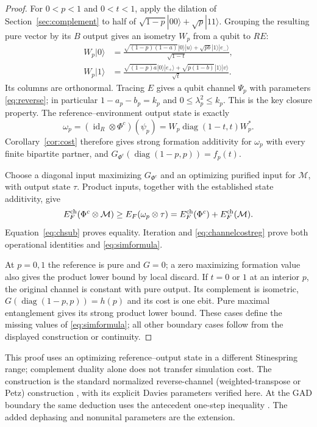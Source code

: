 \documentclass[11pt]{article}
\begin{document}
\begin{proof}
For $0<p<1$ and $0<t<1$, apply the dilation of Section~\ref{sec:complement}
to half of $\sqrt{1-p}|00\rangle+\sqrt p|11\rangle$. Grouping the resulting
pure vector by its $B$ output gives an isometry $W_p$ from a qubit to $R E$:
\begin{align*}
 W_p|0\rangle&=\frac{\sqrt{(1-p)(1-a)}|0\rangle|u\rangle+
                           \sqrt{pb}|1\rangle|e_-\rangle}{\sqrt{1-t}},\\
 W_p|1\rangle&=\frac{\sqrt{(1-p)a}|0\rangle|e_+\rangle+
                           \sqrt{p(1-b)}|1\rangle|v\rangle}{\sqrt t}.
\end{align*}
Its columns are orthonormal. Tracing $E$ gives a qubit channel $\Psi_p$ with
parameters \eqref{eq:reverse}; in particular $1-a_p-b_p=k_p$ and
$0\le\lambda_p^2\le k_p$. This is the key closure property. The
reference--environment output state is exactly
\[
 \omega_p=(\operatorname{id}_R\otimes\Phi^c)(\psi_p)
            =W_p\operatorname{diag}(1-t,t)W_p^*.
\]
Corollary~\ref{cor:cost} therefore gives strong formation additivity for
$\omega_p$ with every finite bipartite partner, and
$G_{\Phi^c}(\operatorname{diag}(1-p,p))=f_p(t)$.

Choose a diagonal input maximizing $G_{\Phi^c}$ and an optimizing purified
input for $\mathcal M$, with output state $\tau$. Product inputs, together
with the established state additivity, give
\[
 E_F^{\rm ch}(\Phi^c\otimes\mathcal M)
 \ge E_F(\omega_p\otimes\tau)
 =E_F^{\rm ch}(\Phi^c)+E_F^{\rm ch}(\mathcal M).
\]
Equation~\eqref{eq:chsub} proves equality. Iteration and
\eqref{eq:channelcostreg} prove both operational identities and
\eqref{eq:simformula}.

At $p=0,1$ the reference is pure and $G=0$; a zero maximizing formation value
also gives the product lower bound by local discard. If $t=0$ or $1$ at an
interior $p$, the original channel is constant with pure output. Its
complement is isometric, $G(\operatorname{diag}(1-p,p))=h(p)$ and its cost
is one ebit. Pure maximal entanglement gives its strong product lower bound.
These cases define the missing values of \eqref{eq:simformula}; all other
boundary cases follow from the displayed construction or continuity.
\end{proof}
This proof uses an optimizing reference--output state in a different
Stinespring range; complement duality alone does not transfer simulation
cost. The construction is the standard normalized reverse-channel
(weighted-transpose or Petz) construction \cite{barnumknill}, with its
explicit Davies parameters verified here. At the
GAD boundary the same deduction uses the antecedent one-step inequality
\cite{openai}. The added dephasing and nonunital parameters are the extension.
\end{document}
